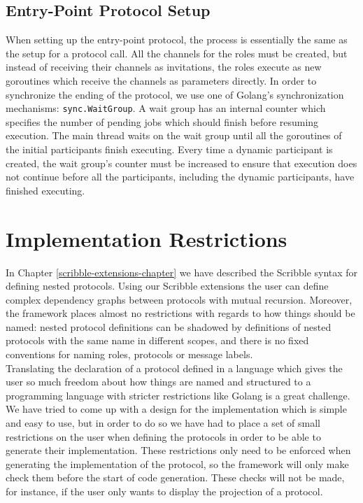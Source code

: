\documentclass[12pt,twoside]{report}
\begin{document}
\subsection{Entry-Point Protocol Setup}

When setting up the entry-point protocol, the process is essentially the same as the setup for a protocol call. All the channels for the roles must be created, but instead of receiving their channels as invitations, the roles execute as new goroutines which receive the channels as parameters directly. In order to synchronize the ending of the protocol, we use one of Golang's synchronization mechanisms: \texttt{sync.WaitGroup}. A wait group has an internal counter which specifies the number of pending jobs which should finish before resuming execution. The main thread waits on the wait group until all the goroutines of the initial participants finish executing. Every time a dynamic participant is created, the wait group's counter must be increased to ensure that execution does not continue before all the participants, including the dynamic participants, have finished executing.

\section{Implementation Restrictions}\label{implementation-restrictions}
In Chapter \ref{scribble-extensions-chapter} we have described the Scribble syntax for defining nested protocols. Using our Scribble extensions the user can define complex dependency graphs between protocols with mutual recursion. Moreover, the framework places almost no restrictions with regards to how things should be named: nested protocol definitions can be shadowed by definitions of nested protocols with the same name in different scopes, and there is no fixed conventions for naming roles, protocols or message labels.\\

Translating the declaration of a protocol defined in a language which gives the user so much freedom about how things are named and structured to a programming language with stricter restrictions like Golang is a great challenge. We have tried to come up with a design for the implementation which is simple and easy to use, but in order to do so we have had to place a set of small restrictions on the user when defining the protocols in order to be able to generate their implementation. These restrictions only need to be enforced when generating the implementation of the protocol, so the framework will only make check them before the start of code generation. These checks will not be made, for instance, if the user only wants to display the projection of a protocol.
\end{document}
